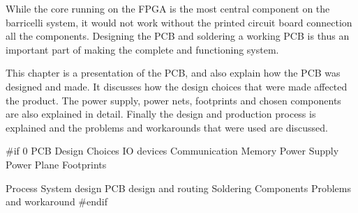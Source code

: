 
While the core running on the FPGA is the most central component on the barricelli system, it would not work without the printed circuit board connection all the components.
Designing the PCB and soldering a working PCB is thus an important part of making the complete and functioning system.

This chapter is a presentation of the PCB, and also explain how the PCB was designed and made.
It discusses how the design choices that were made affected the product.
The power supply, power nets, footprints and chosen components are also explained in detail.
Finally the design and production process is explained and the problems and workarounds that were used are discussed.

 \label{pcb:section:design_choices}

 \label{pcb:section:power_supply}

 \label{pcb:section:power_plane}

 \label{pcb:section:footprints}

 \label{pcb:section:process}

 \label{pcb:section:components}

 \label{pcb:section:problems_and_workaround}

\#if 0
PCB
    Design Choices
        IO devices
        Communication
        Memory
    Power Supply
    Power Plane
    Footprints
        
    Process
        System design
        PCB design and routing
        Soldering
    Components
    Problems and workaround
\#endif
